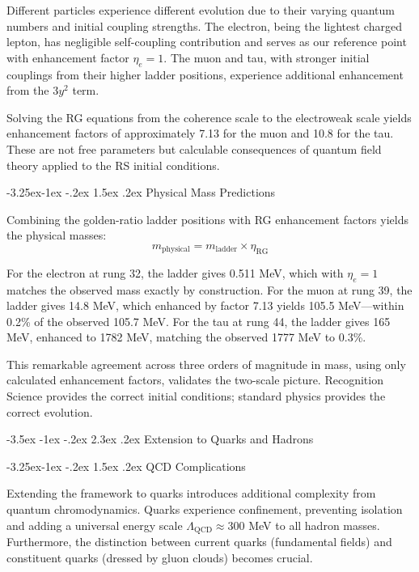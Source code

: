 \documentclass[11pt,a4paper]{article}
\makeatletter
\renewcommand\section{\@startsection{section}{1}{\z@}%
  {-3.5ex \@plus -1ex \@minus -.2ex}%
  {2.3ex \@plus.2ex}%
  {\normalfont\Large\bfseries\color{darkblue}}}
\renewcommand\subsection{\@startsection{subsection}{2}{\z@}%
  {-3.25ex\@plus -1ex \@minus -.2ex}%
  {1.5ex \@plus .2ex}%
  {\normalfont\large\bfseries\color{darkblue}}}
\theoremstyle{definition}
\makeatother
\begin{document}
Different particles experience different evolution due to their varying quantum numbers and initial coupling strengths. The electron, being the lightest charged lepton, has negligible self-coupling contribution and serves as our reference point with enhancement factor $\eta_e = 1$. The muon and tau, with stronger initial couplings from their higher ladder positions, experience additional enhancement from the $3y^2$ term.

Solving the RG equations from the coherence scale to the electroweak scale yields enhancement factors of approximately 7.13 for the muon and 10.8 for the tau. These are not free parameters but calculable consequences of quantum field theory applied to the RS initial conditions.

\subsection{Physical Mass Predictions}

Combining the golden-ratio ladder positions with RG enhancement factors yields the physical masses:
\begin{equation}
m_{\text{physical}} = m_{\text{ladder}} \times \eta_{\text{RG}}
\end{equation}

For the electron at rung 32, the ladder gives 0.511 MeV, which with $\eta_e = 1$ matches the observed mass exactly by construction. For the muon at rung 39, the ladder gives 14.8 MeV, which enhanced by factor 7.13 yields 105.5 MeV—within 0.2\% of the observed 105.7 MeV. For the tau at rung 44, the ladder gives 165 MeV, enhanced to 1782 MeV, matching the observed 1777 MeV to 0.3\%.

This remarkable agreement across three orders of magnitude in mass, using only calculated enhancement factors, validates the two-scale picture. Recognition Science provides the correct initial conditions; standard physics provides the correct evolution.

\section{Extension to Quarks and Hadrons}

\subsection{QCD Complications}

Extending the framework to quarks introduces additional complexity from quantum chromodynamics. Quarks experience confinement, preventing isolation and adding a universal energy scale $\Lambda_{\text{QCD}} \approx 300$ MeV to all hadron masses. Furthermore, the distinction between current quarks (fundamental fields) and constituent quarks (dressed by gluon clouds) becomes crucial.
\end{document}
